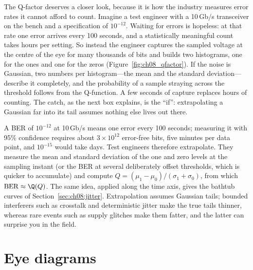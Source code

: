 The Q-factor deserves a closer look, because it is how the industry measures error rates it
cannot afford to count. Imagine a test engineer with a 10\,Gb/s transceiver on the bench and a
specification of $10^{-12}$. Waiting for errors is hopeless: at that rate one error arrives
every 100 seconds, and a statistically meaningful count takes hours per setting. So instead
the engineer captures the sampled voltage at the centre of the eye for many thousands of bits
and builds two histograms, one for the ones and one for the zeros
(Figure~\ref{fig:ch08_qfactor}). If the noise is Gaussian, two numbers per histogram---the mean
and the standard deviation---describe it completely, and the probability of a sample straying
across the threshold follows from the Q-function. A few seconds of capture replaces hours of
counting. The catch, as the next box explains, is the ``if'': extrapolating a Gaussian far
into its tail assumes nothing else lives out there.


\begin{inpractice}
A BER of $10^{-12}$ at 10\,Gb/s means one error every 100 seconds; measuring it with 95\%
confidence requires about $3\times10^{12}$ error-free bits, five minutes per data point, and
$10^{-15}$ would take days. Test engineers therefore extrapolate. They measure the mean and
standard deviation of the one and zero levels at the sampling instant (or the BER at several
deliberately offset thresholds, which is quicker to accumulate) and compute
$Q=(\mu_1-\mu_0)/(\sigma_1+\sigma_0)$, from which $\mathrm{BER}\approx\Q(Q)$. The same idea,
applied along the time axis, gives the bathtub curves of Section~\ref{sec:ch08:jitter}.
Extrapolation assumes Gaussian tails; bounded interferers such as crosstalk and deterministic
jitter make the true tails thinner, whereas rare events such as supply glitches make them
fatter, and the latter can surprise you in the field.
\end{inpractice}

\section{Eye diagrams}
\label{sec:ch08:eyes}

